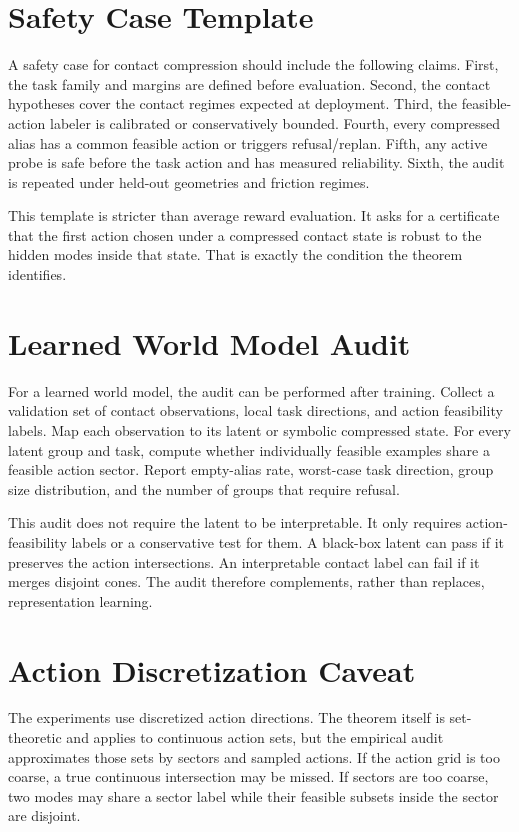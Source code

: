 \documentclass{article}
\begin{document}
\section{Safety Case Template}
A safety case for contact compression should include the following claims. First, the task family and margins are defined before evaluation. Second, the contact hypotheses cover the contact regimes expected at deployment. Third, the feasible-action labeler is calibrated or conservatively bounded. Fourth, every compressed alias has a common feasible action or triggers refusal/replan. Fifth, any active probe is safe before the task action and has measured reliability. Sixth, the audit is repeated under held-out geometries and friction regimes.

This template is stricter than average reward evaluation. It asks for a certificate that the first action chosen under a compressed contact state is robust to the hidden modes inside that state. That is exactly the condition the theorem identifies.

\section{Learned World Model Audit}
For a learned world model, the audit can be performed after training. Collect a validation set of contact observations, local task directions, and action feasibility labels. Map each observation to its latent or symbolic compressed state. For every latent group and task, compute whether individually feasible examples share a feasible action sector. Report empty-alias rate, worst-case task direction, group size distribution, and the number of groups that require refusal.

This audit does not require the latent to be interpretable. It only requires action-feasibility labels or a conservative test for them. A black-box latent can pass if it preserves the action intersections. An interpretable contact label can fail if it merges disjoint cones. The audit therefore complements, rather than replaces, representation learning.

\section{Action Discretization Caveat}
The experiments use discretized action directions. The theorem itself is set-theoretic and applies to continuous action sets, but the empirical audit approximates those sets by sectors and sampled actions. If the action grid is too coarse, a true continuous intersection may be missed. If sectors are too coarse, two modes may share a sector label while their feasible subsets inside the sector are disjoint.
\end{document}

